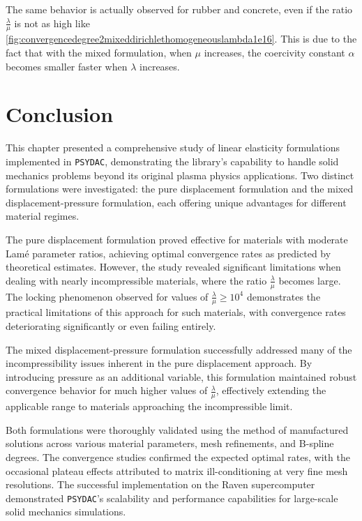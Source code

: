 \documentclass[a4paper,12pt,twoside]{report}
\begin{document}
The same behavior is actually observed for rubber and concrete, even if the ratio $\frac{\lambda}{\mu}$ is not as high like \ref{fig:convergencedegree2mixeddirichlethomogeneouslambda1e16}. This is due to the fact that with the mixed formulation, when $\mu$ increases, the coercivity constant $\alpha$ becomes smaller faster when $\lambda$ increases.

\section{Conclusion}

This chapter presented a comprehensive study of linear elasticity formulations implemented in \texttt{PSYDAC}, demonstrating the library's capability to handle solid mechanics problems beyond its original plasma physics applications. Two distinct formulations were investigated: the pure displacement formulation and the mixed displacement-pressure formulation, each offering unique advantages for different material regimes.

The pure displacement formulation proved effective for materials with moderate Lamé parameter ratios, achieving optimal convergence rates as predicted by theoretical estimates. However, the study revealed significant limitations when dealing with nearly incompressible materials, where the ratio $\frac{\lambda}{\mu}$ becomes large. The locking phenomenon observed for values of $\frac{\lambda}{\mu} \geq 10^4$ demonstrates the practical limitations of this approach for such materials, with convergence rates deteriorating significantly or even failing entirely.

The mixed displacement-pressure formulation successfully addressed many of the incompressibility issues inherent in the pure displacement approach. By introducing pressure as an additional variable, this formulation maintained robust convergence behavior for much higher values of $\frac{\lambda}{\mu}$, effectively extending the applicable range to materials approaching the incompressible limit. 

Both formulations were thoroughly validated using the method of manufactured solutions across various material parameters, mesh refinements, and B-spline degrees. The convergence studies confirmed the expected optimal rates, with the occasional plateau effects attributed to matrix ill-conditioning at very fine mesh resolutions. The successful implementation on the Raven supercomputer demonstrated \texttt{PSYDAC}'s scalability and performance capabilities for large-scale solid mechanics simulations.
\end{document}
